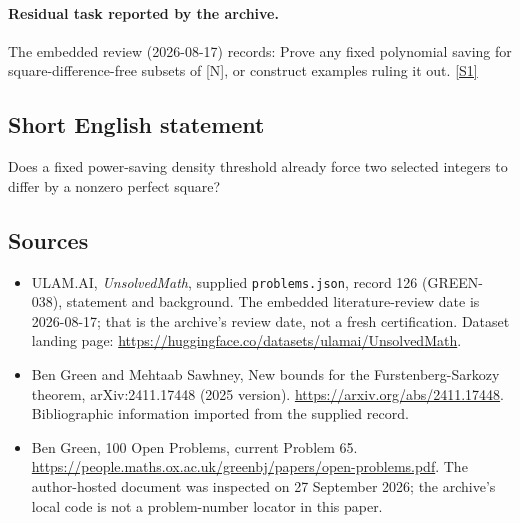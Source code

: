 \documentclass[11pt,a4paper]{article}
\newcommand{\sref}[2]{\hyperlink{source:#1:#2}{[S#2]}}
\begin{document}
\paragraph{Residual task reported by the archive.}

The embedded review (2026-08-17) records: Prove any fixed polynomial saving for square-difference-free subsets of [N], or construct examples ruling it out. \sref{126}{1}

\subsection{Short English statement}

Does a fixed power-saving density threshold already force two selected integers to differ by a nonzero perfect square?

\subsection{Sources}

{\small

\begin{itemize}

\item[\hypertarget{source:126:1}{S1}] ULAM.AI, \emph{UnsolvedMath}, supplied \texttt{problems.json}, record 126 (GREEN-038), statement and background. The embedded literature-review date is 2026-08-17; that is the archive’s review date, not a fresh certification. Dataset landing page: \url{https://huggingface.co/datasets/ulamai/UnsolvedMath}.

\item[\hypertarget{source:126:2}{S2}] Ben Green and Mehtaab Sawhney, New bounds for the Furstenberg-Sarkozy theorem, arXiv:2411.17448 (2025 version). \url{https://arxiv.org/abs/2411.17448}. Bibliographic information imported from the supplied record.

\item[\hypertarget{source:126:3}{S3}] Ben Green, 100 Open Problems, current Problem 65. \url{https://people.maths.ox.ac.uk/greenbj/papers/open-problems.pdf}. The author-hosted document was inspected on 27 September 2026; the archive’s local code is not a problem-number locator in this paper.

\end{itemize}

}

\label{end:126}
\end{document}
